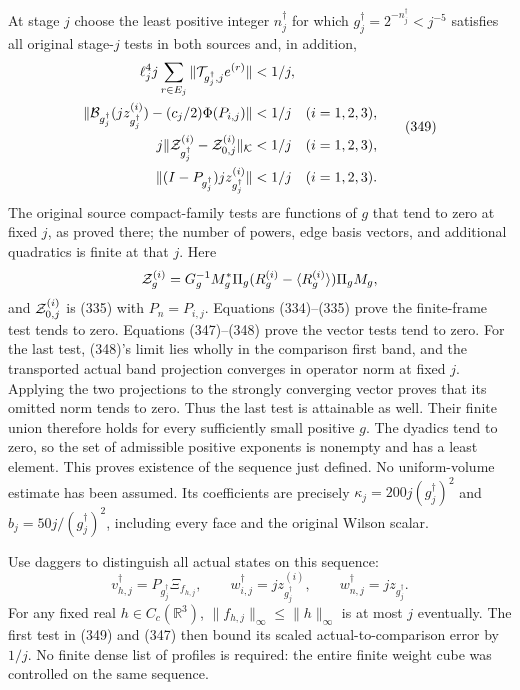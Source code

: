 \documentclass[
  11pt,
]{article}
\begin{document}
At stage \(j\) choose the least positive integer \(n_j^\dagger\) for
which \(g_j^\dagger=2^{-n_j^\dagger}<j^{-5}\) satisfies all original
stage-\(j\) tests in both sources and, in addition, \[
 \begin{split}
 \ell_j^4 j\sum_{r\in E_j}
       \|{\cal T}_{g_j^\dagger,j}e^{(r)}\|&<1/j,\\
 \|{\cal B}_{g_j^\dagger}(jz_{g_j^\dagger}^{(i)})
            -(c_j/2)\Phi(P_{i,j})\|&<1/j
                 \quad(i=1,2,3),\\
 j\|{\cal Z}_{g_j^\dagger}^{(i)}
                -{\cal Z}_{0,j}^{(i)}\|_{\mathcal K}&<1/j
                 \quad(i=1,2,3),\\
 \|(I-P_{g_j^\dagger})jz_{g_j^\dagger}^{(i)}\|&<1/j
                 \quad(i=1,2,3).
 \end{split}
 \tag{349}
\] The original source compact-family tests are functions of \(g\) that
tend to zero at fixed \(j\), as proved there; the number of powers, edge
basis vectors, and additional quadratics is finite at that \(j\). Here
\[
 {\cal Z}_g^{(i)}
 =G_g^{-1}M_g^*\Pi_g
       (R_g^{(i)}-\langle R_g^{(i)}\rangle)\Pi_gM_g,
\] and \({\cal Z}_{0,j}^{(i)}\) is (335) with \(P_n=P_{i,j}\). Equations
(334)--(335) prove the finite-frame test tends to zero. Equations
(347)--(348) prove the vector tests tend to zero. For the last test,
(348)'s limit lies wholly in the comparison first band, and the
transported actual band projection converges in operator norm at fixed
\(j\). Applying the two projections to the strongly converging vector
proves that its omitted norm tends to zero. Thus the last test is
attainable as well. Their finite union therefore holds for every
sufficiently small positive \(g\). The dyadics tend to zero, so the set
of admissible positive exponents is nonempty and has a least element.
This proves existence of the sequence just defined. No uniform-volume
estimate has been assumed. Its coefficients are precisely
\(\kappa_j=200j(g_j^\dagger)^2\) and \(b_j=50j/(g_j^\dagger)^2\),
including every face and the original Wilson scalar.

Use daggers to distinguish all actual states on this sequence: \[
 v_{h,j}^\dagger=P_{g_j^\dagger}\Xi_{f_{h,j}},\qquad
 w_{i,j}^\dagger=jz_{g_j^\dagger}^{(i)},\qquad
 w_{n,j}^\dagger=jz_{g_j^\dagger}.
\] For any fixed real \(h\in C_c(\mathbb R^3)\),
\(\|f_{h,j}\|_\infty\le\|h\|_\infty\) is at most \(j\) eventually. The
first test in (349) and (347) then bound its scaled actual-to-comparison
error by \(1/j\). No finite dense list of profiles is required: the
entire finite weight cube was controlled on the same sequence.
\end{document}
